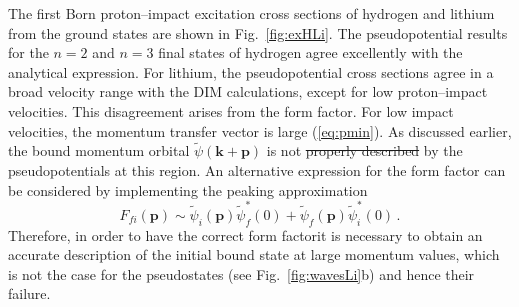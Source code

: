 \documentclass[10pt]{article}
\providecommand{\DIFaddtex}[1]{{\protect\color{blue}\uwave{#1}}} %
\providecommand{\DIFdeltex}[1]{{\protect\color{red}\sout{#1}}}                      %
\providecommand{\DIFaddbegin}{} %
\providecommand{\DIFaddend}{} %
\providecommand{\DIFdelbegin}{} %
\providecommand{\DIFdelend}{} %
\providecommand{\DIFadd}[1]{\texorpdfstring{\DIFaddtex{#1}}{#1}} %
\providecommand{\DIFdel}[1]{\texorpdfstring{\DIFdeltex{#1}}{}} %
\newcommand{\DIFscaledelfig}{0.5}
\newlength{\DIFdelgraphicswidth} %
\newlength{\DIFdelgraphicsheight} %
\newcommand{\DIFaddincludegraphics}[2][]{{\color{blue}\fbox{\DIFOincludegraphics[#1]{#2}}}} %
\newcommand{\DIFdelincludegraphics}[2][]{%
\sbox{\DIFdelgraphicsbox}{\DIFOincludegraphics[#1]{#2}}%
\settoboxwidth{\DIFdelgraphicswidth}{\DIFdelgraphicsbox} %
\settoboxtotalheight{\DIFdelgraphicsheight}{\DIFdelgraphicsbox} %
\scalebox{\DIFscaledelfig}{%
\parbox[b]{\DIFdelgraphicswidth}{\usebox{\DIFdelgraphicsbox}\\[-\baselineskip] \rule{\DIFdelgraphicswidth}{0em}}\llap{\resizebox{\DIFdelgraphicswidth}{\DIFdelgraphicsheight}{%
\setlength{\unitlength}{\DIFdelgraphicswidth}%
\begin{picture}(1,1)%
\thicklines\linethickness{2pt} %
{\color[rgb]{1,0,0}\put(0,0){\framebox(1,1){}}}%
{\color[rgb]{1,0,0}\put(0,0){\line( 1,1){1}}}%
{\color[rgb]{1,0,0}\put(0,1){\line(1,-1){1}}}%
\end{picture}%
}\hspace*{3pt}}} %
} %
\DeclareRobustCommand{\DIFaddbegin}{\DIFOaddbegin \let\includegraphics\DIFaddincludegraphics} %
\DeclareRobustCommand{\DIFaddend}{\DIFOaddend \let\includegraphics\DIFOincludegraphics} %
\DeclareRobustCommand{\DIFdelbegin}{\DIFOdelbegin \let\includegraphics\DIFdelincludegraphics} %
\DeclareRobustCommand{\DIFdelend}{\DIFOaddend \let\includegraphics\DIFOincludegraphics} %
\begin{document}
The first Born proton--impact excitation cross sections of hydrogen 
and lithium from the ground states are shown in Fig.~\ref{fig:exHLi}.
The pseudopotential results for the $n=2$ and $n=3$ final states of
hydrogen agree excellently with the analytical expression. For 
lithium, the pseudopotential cross sections agree in a broad velocity 
range with the DIM calculations, except for low proton--impact velocities. 
This disagreement arises from the form 
factor. For low impact velocities, the momentum transfer vector is large 
(\ref{eq:pmin}). As discussed earlier, the bound momentum orbital
$\widetilde{\psi}(\mathbf{k}+\mathbf{p})$ is not \DIFdelbegin \DIFdel{properly described }\DIFdelend \DIFaddbegin \DIFadd{described adequately 
}\DIFaddend by the pseudopotentials at this region. 
An alternative expression for the form factor can
be considered by implementing the peaking approximation
\begin{equation}
 F_{\!fi}(\mathbf{p}) \sim \widetilde{\psi}_i(\mathbf{p})\widetilde{\psi}_{\!f}^*(0)
 +\widetilde{\psi}_{\!f}(\mathbf{p})\widetilde{\psi}_i^*(0)\,.
\end{equation}
Therefore, in order to have the correct form factor\DIFaddbegin \DIFadd{, }\DIFaddend it is necessary to 
obtain an accurate description of the initial bound state at large
momentum values, which is not the case for the pseudostates (see 
Fig.~\ref{fig:wavesLi}b) and hence their failure.
\end{document}
